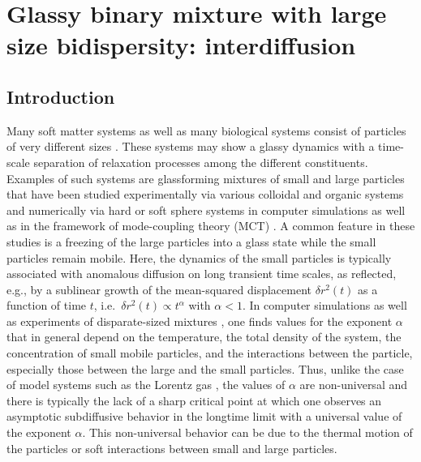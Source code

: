 \pagestyle{fancy}
\fancyhf{}
\renewcommand{\headrulewidth}{0pt}
\fancyfoot[C]{\leftmark}
\fancyhead[R]{\thepage}
\doublespacing
\chapter{Glassy binary mixture with large size bidispersity: interdiffusion}


%
\section{Introduction}
\label{sec1}
%
Many soft matter systems as well as many biological systems consist of particles of very different sizes \cite{bechinger2013, weiss2014, hoefling2013}. These systems may show a glassy dynamics with a time-scale separation of relaxation processes among the different constituents. Examples of such systems are glassforming mixtures of small and large particles that have been studied experimentally via various colloidal and organic systems \cite{imhof1995_1, imhof1995_2, kurita2010, blochowicz2012, bierwirth2018, sentjabrskaja2016, laurati2019} and numerically via hard or soft sphere systems in computer simulations \cite{moreno2006, horbach2009, xu2012, xu2015, lazaro2019} as well as in the framework of mode-coupling theory (MCT) \cite{bosse1987, bosse1995, voigtmann2011}. A common feature in these studies is a freezing of the large particles into a glass state while the small particles remain mobile.  Here, the dynamics of the small particles is typically associated with anomalous diffusion on long transient time scales, as reflected, e.g., by a sublinear growth of the mean-squared displacement $\delta r^2(t)$ as a function of time $t$, i.e.~$\delta r^2(t) \propto t^\alpha$ with $\alpha<1$. In computer simulations as well as experiments of disparate-sized mixtures \cite{kurita2010, blochowicz2012, horbach2009, schnyder2018, kurzidim2011}, one finds values for the exponent $\alpha$ that in general depend on the temperature, the total density of the system, the concentration of small mobile particles, and the interactions between the particle, especially those between the large and the small particles. Thus, {unlike the case of model systems such as the Lorentz gas \cite{hoefling2013, schnyder2018}}, the values of $\alpha$ are non-universal and there is typically the lack of a sharp critical point at which one observes an asymptotic subdiffusive behavior in the longtime limit with a universal value of the exponent $\alpha$.  This non-universal behavior can be due to the thermal motion of the particles or soft interactions between small and large particles.

